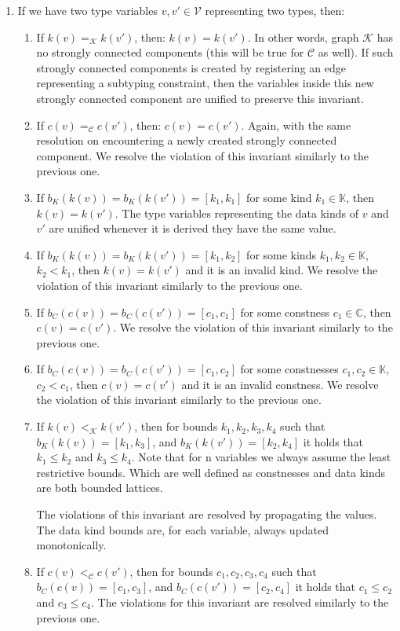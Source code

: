 \begin{defn}
\begin{enumerate}
        \item \label{invG} If we have two type variables $v, v' \in \mathcal{V}$ representing two types, then:
            \begin{enumerate}
                \item If $k (v) =_{\mathcal{K}} k (v')$, then: $k (v) = k(v')$. In other words, graph $\mathcal{K}$ has no strongly connected components (this will be true for $\mathcal{C}$ as well). If such strongly connected components is created by registering an edge representing a subtyping constraint, then the variables inside this new strongly connected component are unified to preserve this invariant.
                \item If $c (v) =_{\mathcal{C}} c (v')$, then: $c (v) = c(v')$. Again, with the same resolution on encountering a newly created strongly connected component. We resolve the violation of this invariant similarly to the previous one.
                \item If $b_K (k (v)) = b_K (k (v')) = [k_1, k_1]$ for some kind $k_1 \in \mathbb{K}$, then $k (v) = k (v')$. The type variables representing the data kinds of $v$ and $v'$ are unified whenever it is derived they have the same value.
                \item If $b_K (k (v)) = b_K (k (v')) = [k_1, k_2]$ for some kinds $k_1, k_2 \in \mathbb{K}$, $k_2 < k_1$, then $k (v) = k (v')$ and it is an invalid kind. We resolve the violation of this invariant similarly to the previous one.
                \item If $b_C (c (v)) = b_C (c (v')) = [c_1, c_1]$ for some constness $c_1 \in \mathbb{C}$, then $c (v) = c (v')$. We resolve the violation of this invariant similarly to the previous one.
                \item If $b_C (c (v)) = b_C (c (v')) = [c_1, c_2]$ for some constnesses $c_1, c_2 \in \mathbb{K}$, $c_2 < c_1$, then $c (v) = c (v')$ and it is an invalid constness. We resolve the violation of this invariant similarly to the previous one.
                \item If $k (v) <_{\mathcal{K}} k (v')$, then for bounds $k_1, k_2, k_3, k_4$ such that $b_K (k (v)) = [k_1, k_3]$, and $b_K (k (v')) = [k_2, k_4]$ it holds that $k_1 \leq k_2$ and $k_3 \leq k_4$. Note that for n variables we always assume the least restrictive bounds. Which are well defined as constnesses and data kinds are both bounded lattices.

                The violations of this invariant are resolved by propagating the values. The data kind bounds are, for each variable, always updated monotonically.
                \item If $c (v) <_{\mathcal{C}} c (v')$, then for bounds $c_1, c_2, c_3, c_4$ such that $b_C (c (v)) = [c_1, c_3]$, and $b_C (c (v')) = [c_2, c_4]$ it holds that $c_1 \leq c_2$ and $c_3 \leq c_4$. The violations for this invariant are resolved similarly to the previous one.
            \end{enumerate}



\end{enumerate}
\end{defn}
